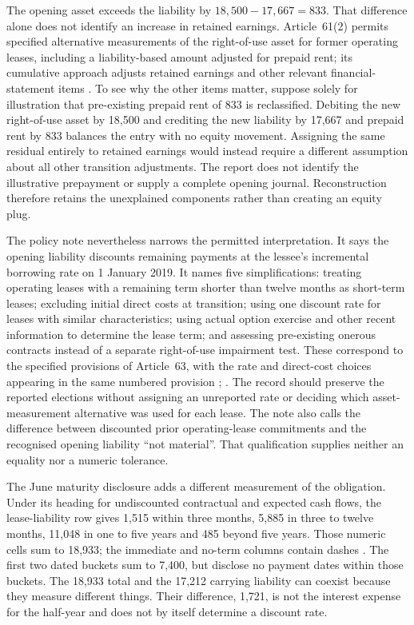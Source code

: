 The opening asset exceeds the liability by $18{,}500-17{,}667=833$. That
difference alone does not identify an increase in retained earnings.
Article~61(2) permits specified alternative measurements of the right-of-use
asset for former operating leases, including a liability-based amount
adjusted for prepaid rent; its cumulative approach adjusts retained earnings
and other relevant financial-statement items
\citep[attachment, art.\ 61(2)]{moflease2018}. To see why the other items
matter, suppose solely for illustration that pre-existing prepaid rent of
833 is reclassified. Debiting the new right-of-use asset by 18,500 and
crediting the new liability by 17,667 and prepaid rent by 833 balances the
entry with no equity movement. Assigning the same residual entirely to
retained earnings would instead require a different assumption about all
other transition adjustments. The report does not identify the illustrative
prepayment or supply a complete opening journal. Reconstruction therefore
retains the unexplained components rather than creating an equity plug.

The policy note nevertheless narrows the permitted interpretation. It says
the opening liability discounts remaining payments at the lessee's
incremental borrowing rate on 1 January 2019. It names five simplifications:
treating operating leases with a remaining term shorter than twelve months
as short-term leases; excluding initial direct costs at transition; using
one discount rate for leases with similar characteristics; using actual
option exercise and other recent information to determine the lease term;
and assessing pre-existing onerous contracts instead of a separate
right-of-use impairment test. These correspond to the specified provisions
of Article~63, with the rate and direct-cost choices appearing in the same
numbered provision \citep[p.\ 113]{pingan2019asbe};
\citep[attachment, art.\ 63]{moflease2018}. The record should preserve
the reported elections without assigning an unreported rate or deciding
which asset-measurement alternative was used for each lease. The note also
calls the difference between discounted prior operating-lease commitments
and the recognised opening liability ``not material''. That qualification
supplies neither an equality nor a numeric tolerance.

The June maturity disclosure adds a different measurement of the obligation.
Under its heading for undiscounted contractual and expected cash flows,
the lease-liability row gives 1,515 within three months, 5,885 in three to
twelve months, 11,048 in one to five years and 485 beyond five years. Those
numeric cells sum to 18,933; the immediate and no-term columns contain
dashes \citep[pp.\ 164--165]{pingan2019asbe}. The first two dated buckets
sum to 7,400, but disclose no payment dates within those buckets. The
18,933 total and the 17,212 carrying liability can coexist because they
measure different things. Their difference, 1,721, is not the interest
expense for the half-year and does not by itself determine a discount rate.

